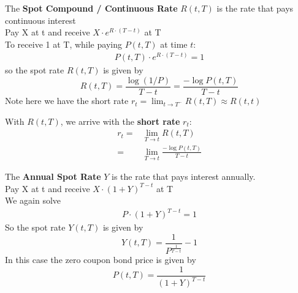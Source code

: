 \begin{definition}
    The \textbf{Spot Compound / Continuous Rate} $R(t, T)$ is the rate that pays continuous interest\\
    Pay X at t and receive $X \cdot e^{R \cdot (T - t)}$ at T \\
    To receive 1 at T, while paying $P(t, T)$ at time $t$: 
    \begin{align*}
        P(t, T) \cdot e^{R \cdot (T - t)} = 1 
    \end{align*}
    so the spot rate $R(t, T)$ is given by
    $$
        R(t, T) = \frac{\log(1/P)}{T - t} = 
        \frac{-\log P(t, T)}{T - t}
    $$
    Note here we have the short rate $r_t = \lim_{t \to T^-}R(t, T) \approx R(t, t)$
\end{definition}

\begin{definition}
With $R(t, T)$, we arrive with the \textbf{short rate} $r_t$:
\begin{align*}
    r_t =& \lim_{T \to t} R(t, T) \\
    =& \lim_{T \to t} \frac{-\log P(t, T)}{T - t} 
\end{align*}
\end{definition}

\begin{definition}
    The \textbf{Annual Spot Rate} $Y$ is the rate that pays interest annually. \\
    Pay X at t and receive $X \cdot (1 + Y)^{T - t}$ at T \\
    We again solve
    \begin{align*}
        P \cdot (1 + Y)^{T - t} = 1
    \end{align*}
    So the spot rate $Y(t, T)$ is given by
    $$
        Y(t, T) = \frac{1}{P^\frac{1}{T - t}} - 1
    $$
    In this case the zero coupon bond price is given by
    $$
        P(t, T) = \frac{1}{(1 + Y)^{T - t}}
    $$
\end{definition}

